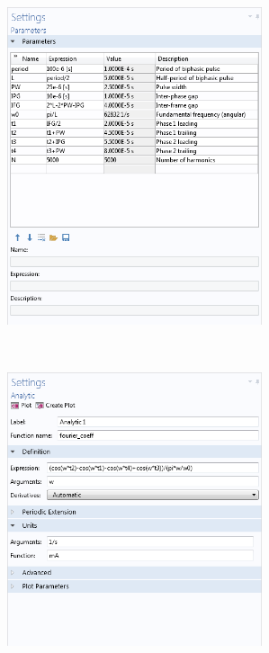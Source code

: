 \begin{figure}[p]
    \centering
    
    \begin{subfigure}[t]{\textwidth}
        \centering
        \includegraphics[width=7.5cm]{Simulations/TimeDep/COMSOL_params_crop}
        \caption{}
        \label{fig:COMSOL_params}
    \end{subfigure}\\%
    \vspace{1em}%
	\begin{subfigure}[t]{0.49\textwidth}
        \centering
        \includegraphics[width=7.5cm]{Simulations/TimeDep/COMSOL_analytic_crop}
        \caption{}
        \label{fig:COMSOL_analytic}
    \end{subfigure}%
	\hfill%
    \begin{subfigure}[t]{0.49\textwidth}
        \centering

\end{subfigure}
\end{figure}
